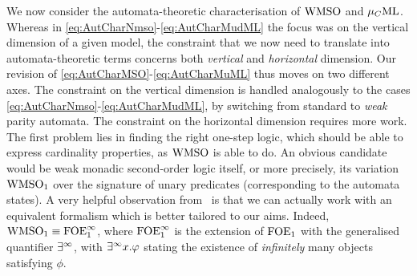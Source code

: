 We now consider the automata-theoretic characterisation of $\mathrm{WMSO}$ and $\mu_{C}\mathrm{ML}$.
Whereas in \eqref{eq:AutCharNmso}-\eqref{eq:AutCharMudML} the focus was on the 
vertical dimension of a given model, the constraint that we now need to 
translate into automata-theoretic terms concerns both \emph{vertical} and 
\emph{horizontal} dimension. 
Our revision of \eqref{eq:AutCharMSO}-\eqref{eq:AutCharMuML} thus moves on two
different axes. 
The constraint on the vertical dimension is handled analogously to the cases 
\eqref{eq:AutCharNmso}-\eqref{eq:AutCharMudML}, by switching from standard to
\emph{weak} parity automata. 
The constraint on the horizontal dimension requires more work. 
The first problem lies in finding the right one-step logic, which should be able
to express cardinality properties, as $\mathrm{WMSO}$ is able to do. 
An obvious candidate would be weak monadic second-order logic itself, or more
precisely, its variation $\mathrm{WMSO}_1$ over the signature of unary predicates 
(corresponding to the automata states).
A very helpful observation from~\cite{vaananen77} is that we can actually work
with an equivalent formalism which is better tailored to our aims.
Indeed, $\mathrm{WMSO}_1 \equiv \mathrm{FOE}^{\infty}_1$, where $\mathrm{FOE}^{\infty}_1$ is the extension of $\mathrm{FOE}_1$ with
the generalised quantifier $\exists^\infty$, with $\exists^\infty x. \varphi$ stating the existence of 
\emph{infinitely} many objects satisfying $\phi$. 

